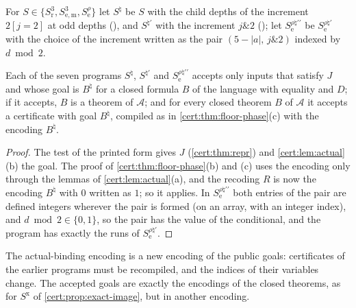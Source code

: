 For $S\in\{S^{3}_{\mathrm r},S^{3}_{\mathrm{e,m}},S^{\rho}_{\mathrm e}\}$ let $S^{\natural}$
be $S$ with the child depths of the increment $2[j=2]$ at odd depths
(), and $S^{\natural\prime}$ with the increment $j\mathbin{\&}2$
(); let $S^{\rho\natural\prime\prime}_{\mathrm e}$ be
$S^{\rho\natural\prime}_{\mathrm e}$ with the choice of the increment written as the pair
$(5-\lvert a\rvert,\,j\mathbin{\&}2)$ indexed by $d\bmod 2$.

\begin{proposition}\label{cert:prop:actual}
Each of the seven programs $S^{\natural}$, $S^{\natural\prime}$ and
$S^{\rho\natural\prime\prime}_{\mathrm e}$ accepts only inputs that satisfy $J$ and whose
goal is $B^{\natural}$ for a closed formula $B$ of the language with equality and $D$; if
it accepts, $B$ is a theorem of $\mathcal A$; and for every closed theorem $B$ of
$\mathcal A$ it accepts a certificate with goal $B^{\natural}$, compiled as in
\cref{cert:thm:floor-phase}(c) with the encoding $B^{\natural}$.
\end{proposition}
\begin{proof}
The test of the printed form gives $J$ (\cref{cert:thm:repr}) and
\cref{cert:lem:actual}(b) the goal. The proof of \cref{cert:thm:floor-phase}(b) and (c)
uses the encoding only through the lemmas of \cref{cert:lem:actual}(a), and the
recoding $R$ is now the encoding $B^{\natural}$ with $0$ written as $1$; so it applies.
In $S^{\rho\natural\prime\prime}_{\mathrm e}$ both entries of the pair are defined
integers wherever the pair is formed (on an array, with an integer index), and
$d\bmod 2\in\{0,1\}$, so the pair has the value of the conditional, and the program has
exactly the runs of $S^{\rho\natural\prime}_{\mathrm e}$.
\end{proof}

The actual-binding encoding is a new encoding of the public goals: certificates of the
earlier programs must be recompiled, and the indices of their variables change. The
accepted goals are exactly the encodings of the closed theorems, as for
$S^{\mathrm x}$ of \cref{cert:prop:exact-image}, but in another encoding.

